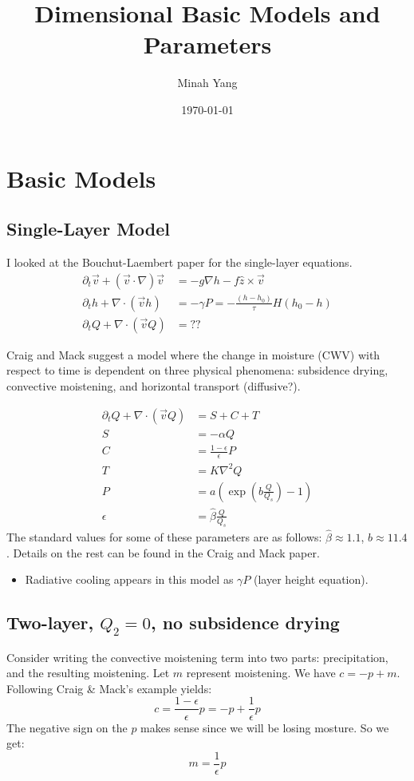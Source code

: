 \documentclass[10pt]{article}
\title{Dimensional Basic Models and Parameters}
\author{Minah Yang}
\date{\today}
\begin{document}
\maketitle
\section{Basic Models}
\subsection{Single-Layer Model}
I looked at the Bouchut-Laembert paper for the single-layer equations.
\begin{align}
\partial_t \vec{v} + \left( \vec{v}\cdot \nabla \right)\vec{v} &= -g\nabla h - f\hat{z}\times \vec{v}\\
\partial_t h + \nabla \cdot \left(\vec{v}h\right) &= -\gamma P = -\frac{(h-h_0)}{\tau}H(h_0-h)\\
\partial_t Q + \nabla \cdot \left(\vec{v}Q\right) &= ?? \label{eq3}
\end{align}

Craig and Mack suggest a model where the change in moisture (CWV) with respect to time is dependent on three physical phenomena: subsidence drying, convective moistening, and horizontal transport (diffusive?). 

\begin{align}
\partial_t Q + \nabla \cdot \left(\vec{v}Q\right) &= S + C + T\\
S &= -\alpha Q \\
C &= \frac{1-\epsilon}{\epsilon} P \\
T &= K \nabla^2 Q\\
P &= a \left(\exp(b\frac{Q}{Q_s}) -1\right)\\
\epsilon &= \hat{\beta} \frac{Q}{Q_s}
\end{align}
The standard values for some of these parameters are as follows: $\hat{\beta} \approx 1.1$, $b \approx 11.4$. Details on the rest can be found in the Craig and Mack paper.

\begin{itemize}
	\item Radiative cooling appears in this model as $\gamma P$ (layer height equation).
\end{itemize}

\subsection{Two-layer, $Q_2 = 0$, no subsidence drying}
Consider writing the convective moistening term into two parts: precipitation, and the resulting moistening. Let $m$ represent moistening.
We have $c = -p + m$. Following Craig \& Mack's example yields: 
\begin{equation}
c = \frac{1-\epsilon}{\epsilon} p = -p + \frac{1}{\epsilon}p
\end{equation}
The negative sign on the $p$ makes sense since we will be losing mosture. So we get:
\begin{equation}
m = \frac{1}{\epsilon} p
\end{equation}
\end{document}
